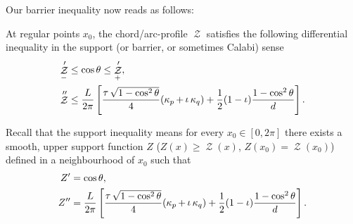 \documentclass[11pt]{amsart}
\DeclareMathOperator{\chordarcprofile}{\mathcal{Z}}
\DeclareMathOperator{\tangindicator}{\iota}
\DeclareMathOperator{\norindicator}{\tau}
\begin{document}
Our barrier inequality now reads as follows:

\begin{theorem}
\label{thm:barrier}
At regular points \(x_0\), the chord/arc-profile $\chordarcprofile$ satisfies the following differential inequality in the support (or barrier, or sometimes Calabi) sense
\begin{align*}
\chordarcprofile'_- &\leq \cos\theta \leq \chordarcprofile'_+, \\
\chordarcprofile'' &\leq \frac{L}{2\pi}\left[\frac{\norindicator \sqrt{1-\cos^2\theta}}{4} (\curvecurv_p + \tangindicator\curvecurv_q) + \frac{1}{2}(1-\tangindicator) \frac{1-\cos^2\theta}{d}\right].
\end{align*}
\end{theorem}

Recall that the support inequality means for every \(x_0 \in [0,2\pi]\) there exists a smooth, upper support function \(Z\) (\(Z(x) \geq \chordarcprofile (x)\), \(Z(x_0) = \chordarcprofile(x_0)\)) defined in a neighbourhood of \(x_0\) such that
\begin{align*}
Z' &= \cos \theta, \\
Z'' &= \frac{L}{2\pi}\left[\frac{\norindicator\sqrt{1-\cos^2\theta}}{4} (\curvecurv_p + \tangindicator\curvecurv_q) + \frac{1}{2} (1-\tangindicator) \frac{1-\cos^2\theta}{d}\right].
\end{align*}
\end{document}
